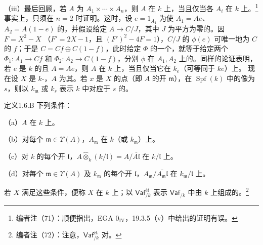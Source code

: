（iii）最后回顾，若 $A$ 为 $A_1\times\cdots\times A_n$，则 $A$ 在 $k$ 上，当且仅当各 $A_i$ 在 $k$ 上。\footnote{编者注（71）：顺便指出，EGA $0_{\mathrm{IV}}$，19.3.5（v）中给出的证明有误。} 事实上，只须在 $n=2$ 时证明。这时，设 $e=1_{A_1}$ 为使 $A_1=Ae$、$A_2=A(1-e)$ 的，并假设给定 $A\to C/J$，其中 $J$ 为平方为零的。因 $F=X^2-X$ （$F'=2X-1$，且 $(F')^2-4F=1$），$C/J$ 的 $\phi(e)$ 可唯一地为 $C$ 的 $f$；于是 $C=Cf\oplus C(1-f)$，此时给定 $\Phi$ 的一个，就等于给定两个 $\Phi_1:A_1\to Cf$ 和 $\Phi_2:A_2\to C(1-f)$，分别 $\phi$ 在 $A_1,A_2$ 上的。同样的论证表明，若 $e$ 是 $k$ 的且 $A=Ae$，则 $A$ 在 $k$ 上，当且仅当它在 $k_e$（可等同于 $ke$）上。
现在设 $X$ 是 $k$-，$A$ 为其。若 $x$ 是 $X$ 的点（即 $A$ 的开 $\mathfrak m$），在 $\operatorname{Spf}(k)$ 中的像为 $s$，则以 $k_{\mathfrak m}$ 或 $k_s$ 表示 $k$ 中对应于 $s$ 的。
\begin{SGAresult}{定义}{1.6.B}
下列条件：

（a）$A$ 在 $k$ 上。

（b）对每个 $\mathfrak m\in\Upsilon(A)$，$A_{\mathfrak m}$ 在 $k$（或 $k_{\mathfrak m}$）上。

（c）对 $k$ 的每个开 $\mathfrak l$，$A\widehat\otimes_k(k/\mathfrak l)=A/\overline{A\mathfrak l}$ 在 $k/\mathfrak l$ 上。

（d）对每个 $\mathfrak m\in\Upsilon(A)$ 及 $k_{\mathfrak m}$ 的每个开 $\mathfrak l$，$A_{\mathfrak m}/\overline{A_{\mathfrak m}\mathfrak l}$ 在 $k_{\mathfrak m}/\mathfrak l$ 上。

若 $X$ 满足这些条件，便称 $X$ 在 $k$ 上；以 $\mathsf{Vaf}^{\text{ét}}_{/k}$ 表示 $\mathsf{Vaf}_{/k}$ 中由 $k$ 上组成的。\footnote{编者注（72）：注意，$\mathsf{Vaf}^{\text{ét}}_{/k}$ 对。}
\end{SGAresult}
